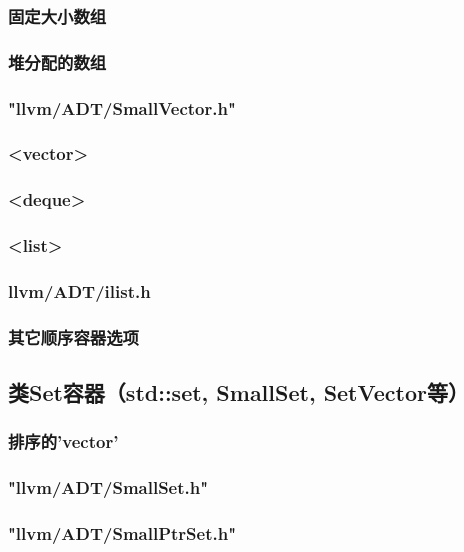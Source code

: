 \documentclass[12pt,a4paper]{article}
\begin{document}
\subsubsection{固定大小数组}

\subsubsection{堆分配的数组}

\subsubsection{"llvm/ADT/SmallVector.h"}

\subsubsection{<vector>}

\subsubsection{<deque>}

\subsubsection{<list>}

\subsubsection{llvm/ADT/ilist.h}

\subsubsection{其它顺序容器选项}

\subsection{类Set容器（std::set, SmallSet, SetVector等）}

\subsubsection{排序的'vector'}

\subsubsection{"llvm/ADT/SmallSet.h"}

\subsubsection{"llvm/ADT/SmallPtrSet.h"}
\end{document}
